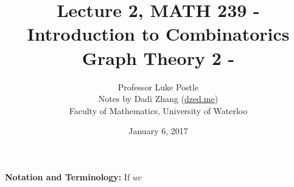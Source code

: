 \documentclass[12pt]{article}
\title{Lecture 2, MATH 239 - Introduction to Combinatorics\\ Graph Theory 2 -}
\date{January 6, 2017}
\author{Professor Luke Postle\\ Notes by Dadi Zhang (\href{http://www.dzed.me}{dzed.me}) \\ Faculty of Mathematics, University of Waterloo}
\begin{document}
\maketitle

\textbf{Notation and Terminology: } If $uv $
\end{document}
